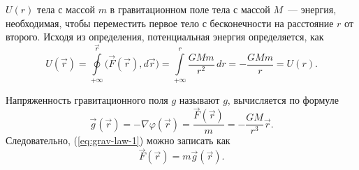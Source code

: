  $U(r)$ тела с массой $m$ в гравитационном поле тела с массой $M$~--- энергия, необходимая, чтобы переместить первое тело с бесконечности на расстояние $r$ от второго. Исходя из определения, потенциальная энергия определяется, как
\begin{equation}
	U(\vec r)
	= \oint\limits_{+\infty}^\vec{r} \big(\vec F( \vec r),d \vec r\big) 
	= \int\limits_{+\infty}^r \frac{GMm}{r^2} \, dr 
	= -\frac{GMm}{r} = U(r).	
\end{equation}

Напряженность гравитационного поля $g$ называют  $g$, вычисляется по формуле
\begin{equation}
	\vec g(\vec r) = -\nabla \varphi(\vec r) = \frac{\vec F( \vec r)}{m} = - \frac{GM}{r^3} \vec r.
	\label{eq:g}
\end{equation} 
Следовательно, (\ref{eq:grav-law-1}) можно записать как
\begin{equation}
	\vec F (\vec r) = m \vec g(\vec r).
\end{equation}
